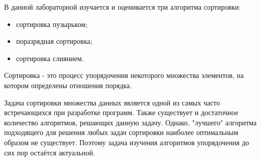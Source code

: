 В данной лабораторной изучается и оценивается три алгоритма сортировки:
\begin{itemize}
	\item сортировка пузырьком;
	\item поразрядная сортировка;
	\item сортировка слиянием.
\end{itemize}

Сортировка - это процесс упорядочения некоторого множества элементов, на котором определены отношения порядка.

Задача сортировки множества данных является одной из самых часто встречающихся при разработке программ. Также существует и достаточное количество алгоритмов, решающих данную задачу. Однако, "лучшего" алгоритма подходящего для решения любых задач сортировки наиболее оптимальным образом не существует. Поэтому задача изучения алгоритмов упорядочения до сих пор остаётся актуальной.


